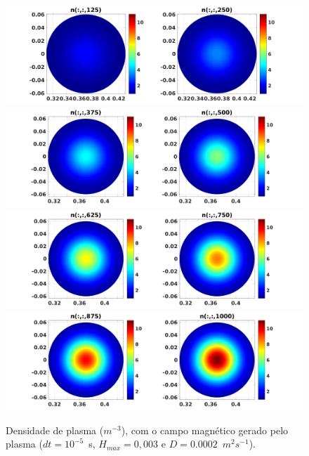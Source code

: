 \documentclass[12pt,oneside,a4paper]{abntex2}
\begin{document}
\begin{figure}[H]
\centering
\includegraphics[scale=0.5]{../SImulacao_breakdown/PDE/ntod1B1.png}  
\includegraphics[scale=0.5]{../SImulacao_breakdown/PDE/ntod2B1.png} 
\includegraphics[scale=0.5]{../SImulacao_breakdown/PDE/ntod3B1.png} 
\includegraphics[scale=0.5]{../SImulacao_breakdown/PDE/ntod4B1.png} 
\caption{Densidade de plasma ($m^{-3}$), com o campo magnético gerado pelo plasma ($dt=10^{-5}$\ s, $H_{max} = 0,003$ e $D=0.0002$\ $m^2s^{-1}$).}
\label{campplasmasi2l1}
\end{figure}
\end{document}

